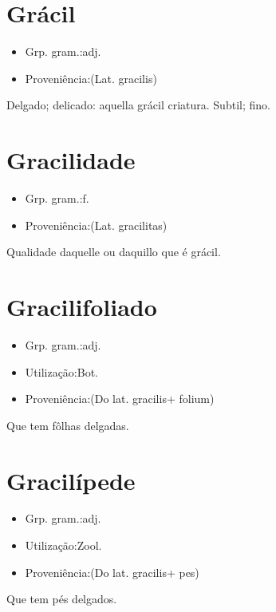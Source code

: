 \section{Grácil}
\begin{itemize}
\item {Grp. gram.:adj.}
\end{itemize}
\begin{itemize}
\item {Proveniência:(Lat. \textunderscore gracilis\textunderscore )}
\end{itemize}
Delgado; delicado: \textunderscore aquella grácil criatura\textunderscore .
Subtil; fino.
\section{Gracilidade}
\begin{itemize}
\item {Grp. gram.:f.}
\end{itemize}
\begin{itemize}
\item {Proveniência:(Lat. \textunderscore gracilitas\textunderscore )}
\end{itemize}
Qualidade daquelle ou daquillo que é grácil.
\section{Gracilifoliado}
\begin{itemize}
\item {Grp. gram.:adj.}
\end{itemize}
\begin{itemize}
\item {Utilização:Bot.}
\end{itemize}
\begin{itemize}
\item {Proveniência:(Do lat. \textunderscore gracilis\textunderscore  + \textunderscore folium\textunderscore )}
\end{itemize}
Que tem fôlhas delgadas.
\section{Gracilípede}
\begin{itemize}
\item {Grp. gram.:adj.}
\end{itemize}
\begin{itemize}
\item {Utilização:Zool.}
\end{itemize}
\begin{itemize}
\item {Proveniência:(Do lat. \textunderscore gracilis\textunderscore  + \textunderscore pes\textunderscore )}
\end{itemize}
Que tem pés delgados.
